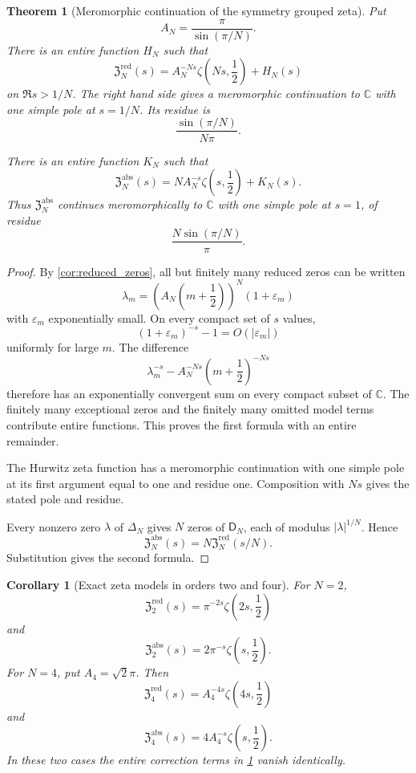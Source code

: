 \documentclass{aomart}
\newtheorem{theorem}{Theorem}[section]
\newtheorem{corollary}[corollary]{Corollary}
\theoremstyle{definition}
\theoremstyle{remark}
\newcommand{\CC}{\mathbb C}
\newcommand{\Dfun}{\mathsf D}
\begin{document}
\begin{theorem}[Meromorphic continuation of the symmetry grouped zeta]\label{thm:zeta_continuation}
Put
\[
A_N=\frac\pi{\sin(\pi/N)}.
\]
There is an entire function $H_N$ such that
\[
\mathfrak Z_N^{\mathrm{red}}(s)
=
A_N^{-Ns}\zeta\left(Ns,\frac12\right)+H_N(s)
\]
on $\Re s>1/N$.  The right hand side gives a meromorphic continuation to $\CC$ with one simple pole at $s=1/N$.  Its residue is
\[
\frac{\sin(\pi/N)}{N\pi}.
\]

There is an entire function $K_N$ such that
\[
\mathfrak Z_N^{\mathrm{abs}}(s)
=
N A_N^{-s}\zeta\left(s,\frac12\right)+K_N(s).
\]
Thus $\mathfrak Z_N^{\mathrm{abs}}$ continues meromorphically to $\CC$ with one simple pole at $s=1$, of residue
\[
\frac{N\sin(\pi/N)}\pi.
\]
\end{theorem}

\begin{proof}
By \cref{cor:reduced_zeros}, all but finitely many reduced zeros can be written
\[
\lambda_m
=
\left(A_N\left(m+\frac12\right)\right)^N(1+\varepsilon_m)
\]
with $\varepsilon_m$ exponentially small.  On every compact set of $s$ values,
\[
(1+\varepsilon_m)^{-s}-1
=
O(|\varepsilon_m|)
\]
uniformly for large $m$.  The difference
\[
\lambda_m^{-s}
-
A_N^{-Ns}\left(m+\frac12\right)^{-Ns}
\]
therefore has an exponentially convergent sum on every compact subset of $\CC$.  The finitely many exceptional zeros and the finitely many omitted model terms contribute entire functions.  This proves the first formula with an entire remainder.

The Hurwitz zeta function has a meromorphic continuation with one simple pole at its first argument equal to one and residue one.  Composition with $Ns$ gives the stated pole and residue.

Every nonzero zero $\lambda$ of $\Delta_N$ gives $N$ zeros of $\Dfun_N$, each of modulus $|\lambda|^{1/N}$.  Hence
\[
\mathfrak Z_N^{\mathrm{abs}}(s)
=
N\mathfrak Z_N^{\mathrm{red}}(s/N).
\]
Substitution gives the second formula.
\end{proof}

\begin{corollary}[Exact zeta models in orders two and four]\label{cor:exact_zeta_models}
For $N=2$,
\[
\mathfrak Z_2^{\mathrm{red}}(s)
=
\pi^{-2s}\zeta\left(2s,\frac12\right)
\]
and
\[
\mathfrak Z_2^{\mathrm{abs}}(s)
=
2\pi^{-s}\zeta\left(s,\frac12\right).
\]
For $N=4$, put $A_4=\sqrt2\pi$.  Then
\[
\mathfrak Z_4^{\mathrm{red}}(s)
=
A_4^{-4s}\zeta\left(4s,\frac12\right)
\]
and
\[
\mathfrak Z_4^{\mathrm{abs}}(s)
=
4A_4^{-s}\zeta\left(s,\frac12\right).
\]
In these two cases the entire correction terms in \cref{thm:zeta_continuation} vanish identically.
\end{corollary}
\end{document}
